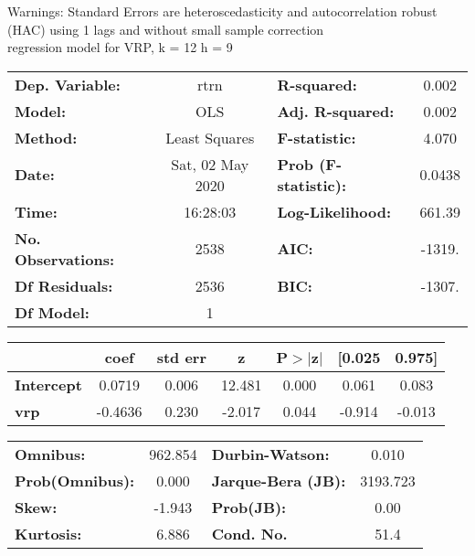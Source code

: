 Warnings: \newline
 [1] Standard Errors are heteroscedasticity and autocorrelation robust (HAC) using 1 lags and without small sample correction\\ 

regression model for VRP, k = 12 h = 9\begin{center}
\begin{tabular}{lclc}
\toprule
\textbf{Dep. Variable:}    &       rtrn       & \textbf{  R-squared:         } &     0.002   \\
\textbf{Model:}            &       OLS        & \textbf{  Adj. R-squared:    } &     0.002   \\
\textbf{Method:}           &  Least Squares   & \textbf{  F-statistic:       } &     4.070   \\
\textbf{Date:}             & Sat, 02 May 2020 & \textbf{  Prob (F-statistic):} &   0.0438    \\
\textbf{Time:}             &     16:28:03     & \textbf{  Log-Likelihood:    } &    661.39   \\
\textbf{No. Observations:} &        2538      & \textbf{  AIC:               } &    -1319.   \\
\textbf{Df Residuals:}     &        2536      & \textbf{  BIC:               } &    -1307.   \\
\textbf{Df Model:}         &           1      & \textbf{                     } &             \\
\bottomrule
\end{tabular}
\begin{tabular}{lcccccc}
                   & \textbf{coef} & \textbf{std err} & \textbf{z} & \textbf{P$> |$z$|$} & \textbf{[0.025} & \textbf{0.975]}  \\
\midrule
\textbf{Intercept} &       0.0719  &        0.006     &    12.481  &         0.000        &        0.061    &        0.083     \\
\textbf{vrp}       &      -0.4636  &        0.230     &    -2.017  &         0.044        &       -0.914    &       -0.013     \\
\bottomrule
\end{tabular}
\begin{tabular}{lclc}
\textbf{Omnibus:}       & 962.854 & \textbf{  Durbin-Watson:     } &    0.010  \\
\textbf{Prob(Omnibus):} &   0.000 & \textbf{  Jarque-Bera (JB):  } & 3193.723  \\
\textbf{Skew:}          &  -1.943 & \textbf{  Prob(JB):          } &     0.00  \\
\textbf{Kurtosis:}      &   6.886 & \textbf{  Cond. No.          } &     51.4  \\
\bottomrule
\end{tabular}
\end{center}

